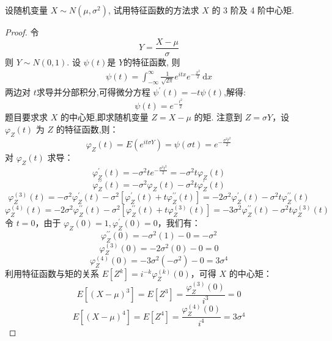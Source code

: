 \documentclass[../main.tex]{subfiles}
\begin{document}
\begin{exercise}{}{}
设随机变量 $X \sim N(\mu, \sigma^2)$, 试用特征函数的方法求 $X$ 的 3 阶及 4 阶中心矩.
\end{exercise}


\begin{proof}
   令 \[
   Y= \frac{X-\mu  }{ \sigma  } 
   \]则 \(  Y\sim N\left( 0,1 \right)   \). 设 \(  \psi \left( t \right)   \)是 \(  Y  \)的特征函数, 则 \[
   \begin{aligned}
   \psi \left( t \right)=   \int_{-\infty}^{\infty}\frac{1 }{\sqrt{2 \pi } }e^{itx}e^{-\frac{x^{2}}{2}}\,\mathrm{d} x
   \end{aligned}
   \]  两边对 \(  t  \)求导并分部积分,可得微分方程 \( \psi^{\prime} \left( t \right) = -t\psi \left( t \right) \),解得:
   \[
   \psi \left( t \right)= e^{-\frac{t^{2} }{2 } } 
   \]
   题目要求求 $X$ 的中心矩,即求随机变量 $Z = X - \mu$ 的矩.
   注意到 $Z = \sigma Y$，设 \( \varphi_Z(t) \) 为 $Z$ 的特征函数,则：
   \[
    \varphi_Z \left( t \right)= E\left( e^{it \sigma Y} \right)  = \psi \left(  \sigma t \right) = e^{-\frac{ \sigma ^{2}t^{2} }{2 } }
   \]
   对 $\varphi_Z(t)$ 求导：
   \[
    \varphi_Z^{\prime} \left( t \right)= -\sigma^2 t e^{-\frac{ \sigma ^{2}t^{2} }{2 } } = -\sigma^2 t \varphi_Z(t)
   \]
   \[
    \varphi_Z^{\prime \prime} \left( t \right)= -\sigma^2 \varphi_Z(t) - \sigma^2 t \varphi_Z^{\prime}(t)
   \]
   \[
    \varphi_Z^{\left( 3 \right) }\left( t \right)= -\sigma^2 \varphi_Z^{\prime}(t) - \sigma^2 \left[ \varphi_Z^{\prime}(t) + t \varphi_Z^{\prime \prime}(t) \right] = -2\sigma^2 \varphi_Z^{\prime}(t) - \sigma^2 t \varphi_Z^{\prime \prime}(t)
   \]
   \[
    \varphi_Z^{\left( 4 \right) }\left( t \right)= -2\sigma^2 \varphi_Z^{\prime \prime}(t) - \sigma^2 \left[ \varphi_Z^{\prime \prime}(t) + t \varphi_Z^{\left( 3 \right) }(t) \right] = -3\sigma^2 \varphi_Z^{\prime \prime}(t) - \sigma^2 t \varphi_Z^{\left( 3 \right) }(t)
   \]
   令 $t=0$，由于 $\varphi_Z(0)=1, \varphi_Z^{\prime}(0)=0$，我们有：
   \[
    \varphi_Z^{\prime \prime} \left( 0 \right)= -\sigma^2 (1) - 0 = -\sigma^2
   \]
   \[
    \varphi_Z^{\left( 3 \right) }\left( 0 \right)= -2\sigma^2 (0) - 0 = 0
   \]
   \[
    \varphi_Z^{\left( 4 \right) }\left( 0 \right)= -3\sigma^2 (-\sigma^2) - 0 = 3\sigma^4
   \]
   利用特征函数与矩的关系 $E[Z^k] = i^{-k}\varphi_Z^{(k)}(0)$，可得 $X$ 的中心矩：
   \[
   E\left[ (X-\mu)^{3} \right] = E[Z^3] = \frac{\varphi_Z^{\left( 3 \right) }\left( 0 \right)}{i^3} = 0
   \]
   \[
   E\left[ (X-\mu)^{4} \right] = E[Z^4] = \frac{\varphi_Z^{\left( 4 \right) }\left( 0 \right)}{i^4} = 3\sigma^4
   \]
\end{proof}
\end{document}
